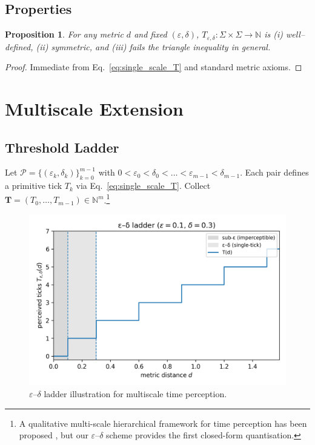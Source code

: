 \documentclass[11pt]{article}
\newtheorem{proposition}{Proposition}
\newcommand{\N}{\mathbb{N}}
\begin{document}
\subsection{Properties}
\begin{proposition}
For any metric $d$ and fixed $(\varepsilon,\delta)$,
$T_{\varepsilon,\delta}\!:\Sigma\times\Sigma\to\N$ is
(i) well--defined, (ii) symmetric, and (iii) fails the triangle
inequality in general.
\end{proposition}

\begin{proof}
Immediate from Eq.~\eqref{eq:single_scale_T} and standard metric
axioms.
\end{proof}

\section{Multiscale Extension}
\subsection{Threshold Ladder}
Let $\mathcal P=\{(\varepsilon_k,\delta_k)\}_{k=0}^{m-1}$ with
$0<\varepsilon_0<\delta_0<\dots<\varepsilon_{m-1}<\delta_{m-1}$.
Each pair defines a primitive tick $T_k$ via
Eq.~\eqref{eq:single_scale_T}.  Collect
$\mathbf T=(T_0,\dots,T_{m-1})\in\N^{m}$.\footnote{A qualitative multi-scale
hierarchical framework for time perception has been proposed
\citep{Singhal2021}, but our $\varepsilon$--$\delta$ scheme provides the first
closed-form quantisation.}

\begin{figure}[ht]
  \centering
  \includegraphics[width=0.9\linewidth]{figures/epsilon_delta_ladder.png}
  \caption{\(\varepsilon\)--\(\delta\) ladder illustration for multiscale time perception.}
  \label{fig:epsilon_delta_ladder}
\end{figure}
\end{document}
